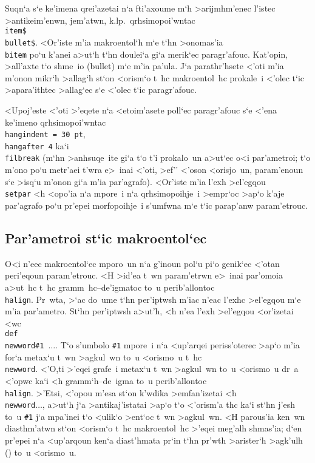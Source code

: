 \exercise Suqn`a s`e ke'imena qrei'azetai n`a fti'axoume m`h
>arijmhm'enec l'istec >antikei\-m'e\-nwn, jem'atwn, k.lp.\
qrhsimopoi'wntac {\tt \\item\lb\$\\bullet\$\rb}.  <Or'iste m'ia
makro\-entol`h m`e t`hn >onomas'ia {\tt \\bitem} po`u k'anei a>ut`h t`hn
doulei`a gi`a merik`ec paragr'afouc.  Kat'opin, >all'axte t`o shme~io
({\rm bullet}) m`e m'ia pa'ula. J`a parathr'hsete <'oti m'ia m'onon
mikr`h >allag`h st`on <orism`o t~hc makro\-entol~hc prokale~i <'olec
t`ic >apara'ithtec >allag`ec s`e <'olec t`ic paragr'afouc.    
    
\exercise <Upoj'este <'oti >'eqete n`a <etoim'asete poll`ec     
paragr'afouc s`e <'ena ke'imeno qrhsimopoi'wntac {\tt \\hangindent = 30
pt}, {\tt \\hangafter 4} ka`i {\tt \\filbreak} (m`hn >anhsuqe~ite gi`a
t`o t'i prokalo~un a>ut`ec o<i par'ametroi;  t`o m'ono po`u metr'aei  
t'wra e>~inai <'oti, >ef'' <'oson <orisjo~un, param'enoun s`e >isq`u
m'onon gi`a m'ia par'agrafo).  <Or'iste m'ia l'exh >el'egqou  {\tt
\\setpar} <h <opo'ia n`a mpore~i n`a qrhsimopoihje~i >empr`oc >ap`o
k'aje par'agrafo po`u pr'epei morfopoihje~i s'umfwna m`e t`ic parap'anw
param'etrouc.     
    
\subsection{Par'ametroi st`ic makroentol`ec}    
    
O<i n'eec makroentol`ec mporo~un n`a g'inoun pol`u pi`o genik`ec <'otan
peri'eqoun param'e\-trouc.  <H >id'ea t~wn param'etrwn e>~inai par'omoia
a>ut~hc t~hc gramm~hc--de'igmatoc to~u peri\-b'al\-lontoc {\tt
\\halign}\null. Pr~wta, >`ac do~ume t`hn per'i\-ptw\-sh m'iac n'eac
l'exhc >el'egqou m`e m'ia par'ametro. St`hn per'i\-ptw\-sh a>ut'h, <h
n'ea l'exh >el'egqou <or'izetai <wc {\tt \\def\\newword\#1\lb
$\ldots$\rb}\null.  T`o s'umbolo {\tt \#1} mpore~i n`a <up'arqei
periss'oterec >ap`o m'ia for`a metax`u t~wn >agkul~wn to~u <orismo~u
t~hc {\tt \\newword}. <'O,ti >'eqei grafe~i metax`u t~wn >agkul~wn to~u
<orismo~u dr~a <'opwc ka`i <h gramm`h--de~igma to~u peri\-b'al\-lontoc
{\tt \\halign}\null.  >'Etsi, <'opou m'esa st`on k'wdika >emfan'izetai
<h {\tt \\newword\lb$\ldots$\rb}, a>ut`h j`a >antikaj'istatai >ap`o t`o
<'orism'a thc ka`i st`hn j'esh to~u {\tt \#1} j`a mpa'inei t`o <ulik`o
>ent`oc t~wn >agkul~wn. {\tengb <H parous'ia ken~wn diasthm'atwn st`on
<orism`o t~hc makroentol~hc >'eqei meg'alh shmas'ia; d`en pr'epei n`a
<up'ar\-qoun ken`a diast'hmata pr`in t`hn pr'wth >arister`h >agk'ulh
({\tt\lb}) to~u <orismo~u.}  

